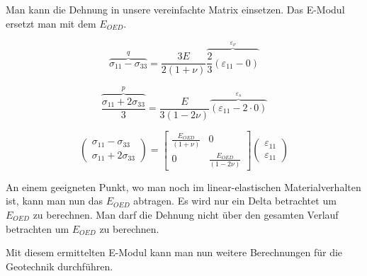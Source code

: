 Man kann die Dehnung in unsere vereinfachte Matrix einsetzen. Das E-Modul ersetzt man mit dem $E_{OED}$.

\[
\overbrace{\sigma_{11}-\sigma_{33}}^{q}
=
\frac{3E}{2(1+\nu)} \overbrace{\frac{2}{3}(\varepsilon_{11} - 0)}^{\varepsilon_{\nu}}
\]

\[
\overbrace{\frac{\sigma_{11}+2\sigma_{33}}{3}}^{p}
=
\frac{E}{3(1-2\nu)} \overbrace{(\varepsilon_{11} - 2\cdot0)}^{\varepsilon_{s}}
\]

\[
\begin{pmatrix}
	\sigma_{11}-\sigma_{33} \\
	\sigma_{11}+2\sigma_{33}
\end{pmatrix}
=
\begin{bmatrix}
	\frac{E_{OED}}{(1+\nu)} & 0 \\
	0 & \frac{E_{OED}}{(1-2\nu)}
\end{bmatrix}
\begin{pmatrix}
	\varepsilon_{11}\\
	\varepsilon_{11}
\end{pmatrix}
\]

An einem geeigneten Punkt, wo man noch im linear-elastischen Materialverhalten ist, kann man nun das $E_{OED}$ abtragen.
Es wird nur ein Delta betrachtet um $E_{OED}$ zu berechnen.
Man darf die Dehnung nicht über den gesamten Verlauf betrachten um $E_{OED}$ zu berechnen.

Mit diesem ermittelten E-Modul kann man nun weitere Berechnungen für die Geotechnik durchführen.
